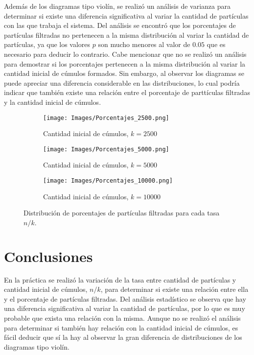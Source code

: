\documentclass{article}
\begin{document}
Adem\'as de los diagramas tipo viol\'in, se realiz\'o un an\'alisis de varianza para determinar si existe una diferencia significativa al variar la cantidad de part\'iculas con las que trabaja el sistema. Del an\'alisis se encontr\'o que los porcentajes de part\'iculas filtradas no pertenecen a la misma distribuci\'on al variar la cantidad de part\'iculas, ya que los valores $p$ son mucho menores al valor de $0.05$ que es necesario para deducir lo contrario. Cabe mencionar que no se realiz\'o un an\'alisis para demostrar si los porcentajes pertenecen a la misma distribuci\'on al variar la cantidad inicial de c\'umulos formados. Sin embargo, al observar los diagramas se puede apreciar una diferencia considerable en las distribuciones, lo cual podr\'ia indicar que tambi\'en existe una relaci\'on entre el porcentaje de partt\'iculas filtradas y la cantidad inicial de c\'umulos.

\begin{figure}
\centering
    \begin{subfigure}[b]{0.49\textwidth}
         \centering
         \texttt{[image: Images/Porcentajes\_2500.png]}
         \caption{Cantidad inicial de c\'umulos, $k=2500$}
         \label{fig2.1}
    \end{subfigure}
    \begin{subfigure}[b]{0.49\textwidth}
         \centering
         \texttt{[image: Images/Porcentajes\_5000.png]}
         \caption{Cantidad inicial de c\'umulos, $k=5000$}
         \label{fig2.2}
    \end{subfigure}
    \begin{subfigure}[b]{0.49\textwidth}
         \centering
         \texttt{[image: Images/Porcentajes\_10000.png]}
         \caption{Cantidad inicial de c\'umulos, $k=10000$}
         \label{fig2.3}
    \end{subfigure}
    \caption{Distribuci\'on de porcentajes de part\'iculas filtradas para cada tasa $n/k$.}
    \label{fig2}
\end{figure}

\section{Conclusiones}\label{con}
En la pr\'actica se realiz\'o la variaci\'on de la tasa entre cantidad de part\'iculas y cantidad inicial de c\'umulos, $n/k$, para determinar si existe una relaci\'on entre ella y el porcentaje de part\'iculas filtradas. Del an\'alisis estad\'istico se observa que hay una diferencia significativa al variar la cantidad de part\'iculas, por lo que es muy probable que exista una relaci\'on con la misma. Aunque no se realiz\'o el an\'alisis para determinar si tambi\'en hay relaci\'on con la cantidad inicial de c\'umulos, es f\'acil deducir que s\'i la hay al observar la gran diferencia de distribuciones de los diagramas tipo viol\'in.



\end{document}
